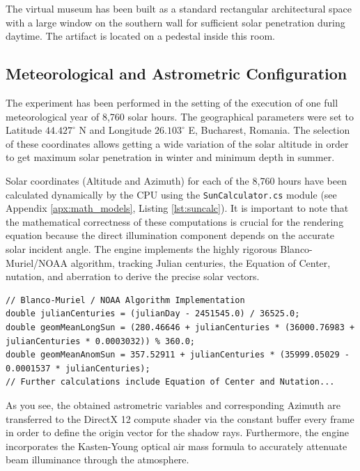 The virtual museum has been built as a standard rectangular architectural space with a large window on the southern wall for sufficient solar penetration during daytime. The artifact is located on a pedestal inside this room.

\subsection{Meteorological and Astrometric Configuration}

The experiment has been performed in the setting of the execution of one full meteorological year of 8,760 solar hours. The geographical parameters were set to Latitude $44.427^\circ$ N and Longitude $26.103^\circ$ E, Bucharest, Romania. The selection of these coordinates allows getting a wide variation of the solar altitude in order to get maximum solar penetration in winter and minimum depth in summer.

Solar coordinates (Altitude and Azimuth) for each of the 8,760 hours have been calculated dynamically by the CPU using the \texttt{SunCalculator.cs} module (see Appendix \ref{apx:math_models}, Listing \ref{lst:suncalc}). It is important to note that the mathematical correctness of these computations is crucial for the rendering equation because the direct illumination component depends on the accurate solar incident angle. The engine implements the highly rigorous Blanco-Muriel/NOAA algorithm, tracking Julian centuries, the Equation of Center, nutation, and aberration to derive the precise solar vectors.

\begin{lstlisting}[language={[Sharp]C}, caption={Astrometric solar elevation calculation based on the NOAA algorithm executed by the CPU orchestrator.}, label={lst:sun_calc}]
// Blanco-Muriel / NOAA Algorithm Implementation
double julianCenturies = (julianDay - 2451545.0) / 36525.0;
double geomMeanLongSun = (280.46646 + julianCenturies * (36000.76983 + julianCenturies * 0.0003032)) % 360.0;
double geomMeanAnomSun = 357.52911 + julianCenturies * (35999.05029 - 0.0001537 * julianCenturies);
// Further calculations include Equation of Center and Nutation...
\end{lstlisting}

As you see, the obtained astrometric variables and corresponding Azimuth are transferred to the DirectX 12 compute shader via the constant buffer every frame in order to define the origin vector for the shadow rays. Furthermore, the engine incorporates the Kasten-Young optical air mass formula to accurately attenuate beam illuminance through the atmosphere.

